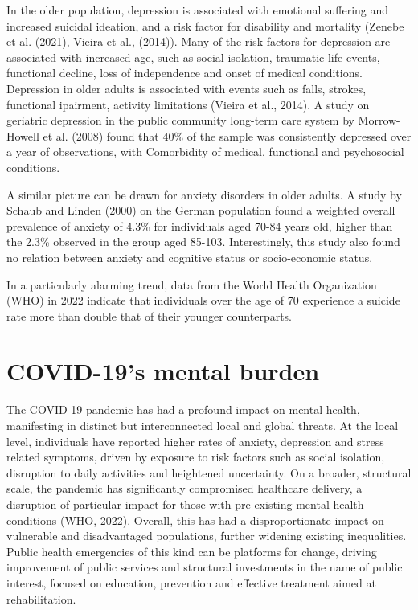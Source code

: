     In the older population, depression is associated with emotional suffering and increased suicidal ideation, and a risk factor for disability and mortality (Zenebe et al. (2021), Vieira et al., (2014)). Many of the risk factors for depression are associated with increased age, such as social isolation, traumatic life events, functional decline, loss of independence and onset of medical conditions. Depression in older adults is associated with events such as falls, strokes, functional ipairment, activity limitations (Vieira et al., 2014). A study on geriatric depression in the public community long-term care system by Morrow-Howell et al. (2008) found that 40\% of the sample was consistently depressed over a year of observations, with Comorbidity of medical, functional and psychosocial conditions.

    A similar picture can be drawn for anxiety disorders in older adults. A study by Schaub and Linden (2000) on the German population found a weighted overall prevalence of anxiety of 4.3\% for individuals aged 70-84 years old, higher than the 2.3\% observed in the group aged 85-103. Interestingly, this study also found no relation between anxiety and cognitive status or socio-economic status.

    In a particularly alarming trend, data from the World Health Organization (WHO) in 2022 indicate that individuals over the age of 70 experience a suicide rate more than double that of their younger counterparts.


 \section{COVID-19's mental burden}
    The COVID-19 pandemic has had a profound impact on mental health, manifesting in distinct but interconnected local and global threats. At the local level, individuals have reported higher rates of anxiety, depression and stress related symptoms, driven by exposure to risk factors such as social isolation, disruption to daily activities and heightened uncertainty. On a broader, structural scale, the pandemic has significantly compromised healthcare delivery, a disruption of particular impact for those with pre-existing mental health conditions (WHO, 2022). Overall, this has had a disproportionate impact on vulnerable and disadvantaged populations, further widening existing inequalities. 
    Public health emergencies of this kind can be platforms for change, driving improvement of public services and structural investments in the name of public interest, focused on education, prevention and effective treatment aimed at rehabilitation. 

